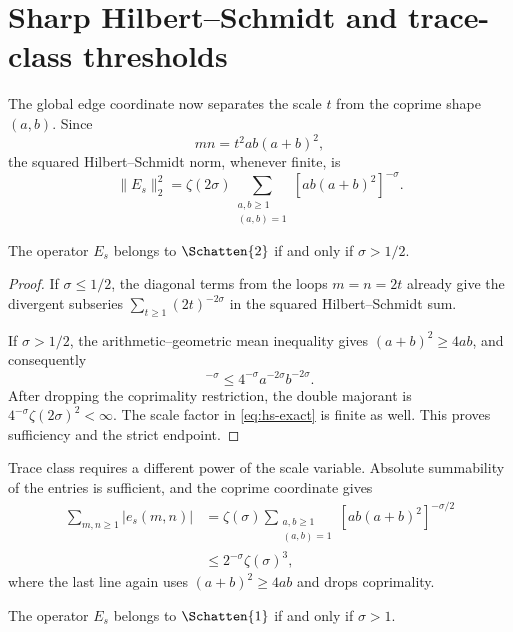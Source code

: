 \section{Sharp Hilbert--Schmidt and trace-class thresholds}
\label{sec:ideal-thresholds}

The global edge coordinate now separates the scale $t$ from the coprime
shape $(a,b)$.  Since
\[
 mn=t^2ab(a+b)^2,
\]
the squared Hilbert--Schmidt norm, whenever finite, is
\begin{equation}
 \|E_s\|_2^2
 =\zeta(2\sigma)
  \sum_{\substack{a,b\geq1\\(a,b)=1}}
  [ab(a+b)^2]^{-\sigma}.
 \label{eq:hs-exact}
\end{equation}

\begin{proposition}
\label{prop:hs-wall}
The operator $E_s$ belongs to $\Schatten{2}$ if and only if
$\sigma>1/2$.
\end{proposition}

\begin{proof}
If $\sigma\leq1/2$, the diagonal terms from the loops $m=n=2t$ already
give the divergent subseries
$\sum_{t\geq1}(2t)^{-2\sigma}$ in the squared Hilbert--Schmidt sum.

If $\sigma>1/2$, the arithmetic--geometric mean inequality gives
$(a+b)^2\geq4ab$, and consequently
\begin{equation}
 [ab(a+b)^2]^{-\sigma}
 \leq4^{-\sigma}a^{-2\sigma}b^{-2\sigma}.
 \label{eq:hs-majorant}
\end{equation}
After dropping the coprimality restriction, the double majorant is
$4^{-\sigma}\zeta(2\sigma)^2<\infty$.  The scale factor in
\eqref{eq:hs-exact} is finite as well.  This proves sufficiency and the
strict endpoint.
\end{proof}

Trace class requires a different power of the scale variable.  Absolute
summability of the entries is sufficient, and the coprime coordinate gives
\begin{align}
 \sum_{m,n\geq1}|e_s(m,n)|
 &=\zeta(\sigma)
  \sum_{\substack{a,b\geq1\\(a,b)=1}}
  [ab(a+b)^2]^{-\sigma/2} \\
 &\leq 2^{-\sigma}\zeta(\sigma)^3,
 \label{eq:absolute-entry-bound}
\end{align}
where the last line again uses $(a+b)^2\geq4ab$ and drops coprimality.

\begin{proposition}
\label{prop:trace-wall}
The operator $E_s$ belongs to $\Schatten{1}$ if and only if $\sigma>1$.
\end{proposition}

